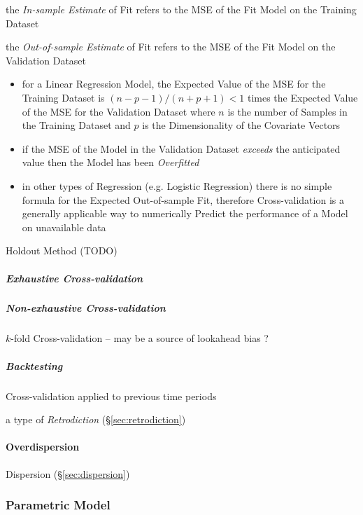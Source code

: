 the \emph{In-sample Estimate} of Fit refers to the MSE of the Fit Model on the
Training Dataset

the \emph{Out-of-sample Estimate} of Fit refers to the MSE of the Fit Model on
the Validation Dataset

\begin{itemize}
  \item for a Linear Regression Model, the Expected Value of the MSE for the
    Training Dataset is $(n - p - 1) / (n + p + 1) < 1$ times the Expected Value
    of the MSE for the Validation Dataset where $n$ is the number of Samples in
    the Training Dataset and $p$ is the Dimensionality of the Covariate Vectors
  \item if the MSE of the Model in the Validation Dataset \emph{exceeds} the
    anticipated value then the Model has been \emph{Overfitted}
  \item in other types of Regression (e.g. Logistic Regression) there is no
    simple formula for the Expected Out-of-sample Fit, therefore
    Cross-validation is a generally applicable way to numerically Predict the
    performance of a Model on unavailable data
\end{itemize}

Holdout Method (TODO)



\subparagraph{Exhaustive Cross-validation}
\label{sec:exhaustive_cross_validation}\hfill

\subparagraph{Non-exhaustive Cross-validation}
\label{sec:nonexhaustive_cross_validation}\hfill

$k$-fold Cross-validation -- may be a source of lookahead bias ?



\subparagraph{Backtesting}\label{sec:backtesting}\hfill

Cross-validation applied to previous time periods

a type of \emph{Retrodiction} (\S\ref{sec:retrodiction})



\paragraph{Overdispersion}\label{sec:overdispersion}\hfill


Dispersion (\S\ref{sec:dispersion})



\subsubsection{Parametric Model}\label{sec:parametric_model}

